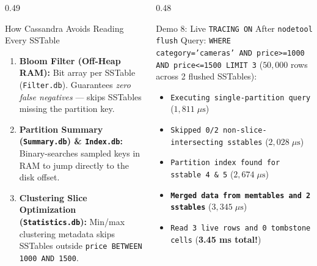 \documentclass[aspectratio=169]{beamer}
\begin{document}
\begin{frame}
\vspace{0.12cm}
\begin{columns}[T]
\begin{column}{0.49\textwidth}
\begin{block}{\scriptsize How Cassandra Avoids Reading Every SSTable}
\scriptsize
\begin{enumerate}
    \item \textbf{Bloom Filter (Off-Heap RAM):} Bit array per SSTable (\texttt{Filter.db}). Guarantees \emph{zero false negatives} --- skips SSTables missing the partition key.
    \item \textbf{Partition Summary (\texttt{Summary.db}) \& \texttt{Index.db}:} Binary-searches sampled keys in RAM to jump directly to the disk offset.
    \item \textbf{Clustering Slice Optimization (\texttt{Statistics.db}):} Min/max clustering metadata skips SSTables outside \texttt{price BETWEEN 1000 AND 1500}.
\end{enumerate}
\end{block}
\end{column}
\begin{column}{0.48\textwidth}
\begin{alertblock}{\scriptsize Demo 8: Live \texttt{TRACING ON} After \texttt{nodetool flush}}
\scriptsize
Query: \texttt{WHERE category='cameras' AND price>=1000 AND price<=1500 LIMIT 3} ($50,000$ rows across 2 flushed SSTables):
\begin{itemize}
    \item \texttt{Executing single-partition query} ($1,811\;\mu\text{s}$)
    \item \texttt{Skipped 0/2 non-slice-intersecting sstables} ($2,028\;\mu\text{s}$)
    \item \texttt{Partition index found for sstable 4 \& 5} ($2,674\;\mu\text{s}$)
    \item \texttt{\textbf{Merged data from memtables and 2 sstables}} ($3,345\;\mu\text{s}$)
    \item \texttt{Read 3 live rows and 0 tombstone cells} (\textbf{3.45 ms total!})
\end{itemize}
\end{alertblock}
\end{column}
\end{columns}
\end{frame}
\end{document}
